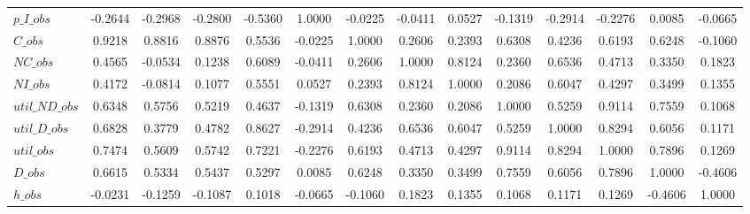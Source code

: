 \begin{center}
\begin{longtable}{lccccccccccccc}
$p\_I\_obs      $	 & 	          -0.2644	 & 	          -0.2968	 & 	          -0.2800	 & 	          -0.5360	 & 	           1.0000	 & 	          -0.0225	 & 	          -0.0411	 & 	           0.0527	 & 	          -0.1319	 & 	          -0.2914	 & 	          -0.2276	 & 	           0.0085	 & 	          -0.0665 \\ 
$C\_obs         $	 & 	           0.9218	 & 	           0.8816	 & 	           0.8876	 & 	           0.5536	 & 	          -0.0225	 & 	           1.0000	 & 	           0.2606	 & 	           0.2393	 & 	           0.6308	 & 	           0.4236	 & 	           0.6193	 & 	           0.6248	 & 	          -0.1060 \\ 
$NC\_obs        $	 & 	           0.4565	 & 	          -0.0534	 & 	           0.1238	 & 	           0.6089	 & 	          -0.0411	 & 	           0.2606	 & 	           1.0000	 & 	           0.8124	 & 	           0.2360	 & 	           0.6536	 & 	           0.4713	 & 	           0.3350	 & 	           0.1823 \\ 
$NI\_obs        $	 & 	           0.4172	 & 	          -0.0814	 & 	           0.1077	 & 	           0.5551	 & 	           0.0527	 & 	           0.2393	 & 	           0.8124	 & 	           1.0000	 & 	           0.2086	 & 	           0.6047	 & 	           0.4297	 & 	           0.3499	 & 	           0.1355 \\ 
$util\_ND\_obs  $	 & 	           0.6348	 & 	           0.5756	 & 	           0.5219	 & 	           0.4637	 & 	          -0.1319	 & 	           0.6308	 & 	           0.2360	 & 	           0.2086	 & 	           1.0000	 & 	           0.5259	 & 	           0.9114	 & 	           0.7559	 & 	           0.1068 \\ 
$util\_D\_obs   $	 & 	           0.6828	 & 	           0.3779	 & 	           0.4782	 & 	           0.8627	 & 	          -0.2914	 & 	           0.4236	 & 	           0.6536	 & 	           0.6047	 & 	           0.5259	 & 	           1.0000	 & 	           0.8294	 & 	           0.6056	 & 	           0.1171 \\ 
$util\_obs      $	 & 	           0.7474	 & 	           0.5609	 & 	           0.5742	 & 	           0.7221	 & 	          -0.2276	 & 	           0.6193	 & 	           0.4713	 & 	           0.4297	 & 	           0.9114	 & 	           0.8294	 & 	           1.0000	 & 	           0.7896	 & 	           0.1269 \\ 
$D\_obs         $	 & 	           0.6615	 & 	           0.5334	 & 	           0.5437	 & 	           0.5297	 & 	           0.0085	 & 	           0.6248	 & 	           0.3350	 & 	           0.3499	 & 	           0.7559	 & 	           0.6056	 & 	           0.7896	 & 	           1.0000	 & 	          -0.4606 \\ 
$h\_obs         $	 & 	          -0.0231	 & 	          -0.1259	 & 	          -0.1087	 & 	           0.1018	 & 	          -0.0665	 & 	          -0.1060	 & 	           0.1823	 & 	           0.1355	 & 	           0.1068	 & 	           0.1171	 & 	           0.1269	 & 	          -0.4606	 & 	           1.0000 \\ 
\end{longtable}
 \end{center}
